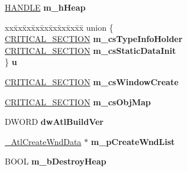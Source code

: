 \begin{DoxyCompactItemize}
\hyperlink{interfacevoid}{H\+A\+N\+D\+LE} {\bfseries m\+\_\+h\+Heap}
\item 
\mbox{\label{struct___a_t_l___m_o_d_u_l_e_w___t_a_g_a5048d6896ea6b92b360a5b0dfa2ad0ed}} 
\begin{tabbing}
xx\=xx\=xx\=xx\=xx\=xx\=xx\=xx\=xx\=\kill
union \{\\
\>\hyperlink{struct___c_r_i_t_i_c_a_l___s_e_c_t_i_o_n}{CRITICAL\_SECTION} {\bfseries m\_csTypeInfoHolder}\\
\>\hyperlink{struct___c_r_i_t_i_c_a_l___s_e_c_t_i_o_n}{CRITICAL\_SECTION} {\bfseries m\_csStaticDataInit}\\
\} {\bfseries u}\\

\end{tabbing}\item 
\mbox{\label{struct___a_t_l___m_o_d_u_l_e_w___t_a_g_a7a29736542f43618e4c1c7a04ad3500b}} 
\hyperlink{struct___c_r_i_t_i_c_a_l___s_e_c_t_i_o_n}{C\+R\+I\+T\+I\+C\+A\+L\+\_\+\+S\+E\+C\+T\+I\+ON} {\bfseries m\+\_\+cs\+Window\+Create}
\item 
\mbox{\label{struct___a_t_l___m_o_d_u_l_e_w___t_a_g_a9cd7984641c077296e51cd579536d759}} 
\hyperlink{struct___c_r_i_t_i_c_a_l___s_e_c_t_i_o_n}{C\+R\+I\+T\+I\+C\+A\+L\+\_\+\+S\+E\+C\+T\+I\+ON} {\bfseries m\+\_\+cs\+Obj\+Map}
\item 
\mbox{\label{struct___a_t_l___m_o_d_u_l_e_w___t_a_g_aff9e5fea6ad2765c0abb789c57016094}} 
D\+W\+O\+RD {\bfseries dw\+Atl\+Build\+Ver}
\item 
\mbox{\label{struct___a_t_l___m_o_d_u_l_e_w___t_a_g_abb39945723fc61f087f306352bfe9df5}} 
\hyperlink{struct___atl_create_wnd_data___t_a_g}{\+\_\+\+Atl\+Create\+Wnd\+Data} $\ast$ {\bfseries m\+\_\+p\+Create\+Wnd\+List}
\item 
\mbox{\label{struct___a_t_l___m_o_d_u_l_e_w___t_a_g_a761430ebed3dae174e4379b874c6e899}} 
B\+O\+OL {\bfseries m\+\_\+b\+Destroy\+Heap}
\item 
\mbox{\label{struct___a_t_l___m_o_d_u_l_e_w___t_a_g_a84568b9090c834ebd0c5881c109d9648}} 

\end{DoxyCompactItemize}
